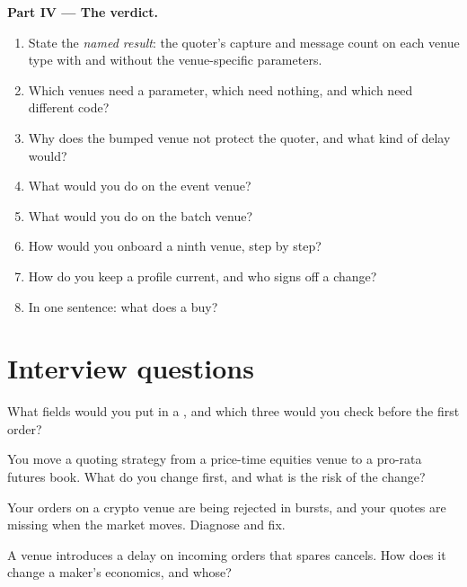 \begin{problem}
\medskip\noindent\textbf{Part IV --- The verdict.}
\begin{enumerate}[resume]
\item State the \emph{named result}: the quoter's capture and message count on each venue type with and without the venue-specific parameters.
\item Which venues need a parameter, which need nothing, and which need different code?
\item Why does the bumped venue not protect the quoter, and what kind of delay would?
\item What would you do on the event venue?
\item What would you do on the batch venue?
\item How would you onboard a ninth venue, step by step?
\item How do you keep a profile current, and who signs off a change?
\item In one sentence: what does a  buy?
\end{enumerate}
\end{problem}

\section{Interview questions}

\begin{interviewq}\label{iq:hf:a-venue-playbook:1}
What fields would you put in a , and which three would you check before the first order?
\end{interviewq}

\begin{interviewq}\label{iq:hf:a-venue-playbook:2}
You move a quoting strategy from a price-time equities venue to a pro-rata futures book. What do you change first, and what is the risk of the
change?
\end{interviewq}

\begin{interviewq}\label{iq:hf:a-venue-playbook:3}
Your orders on a crypto venue are being rejected in bursts, and your quotes are missing when the market moves. Diagnose and fix.
\end{interviewq}

\begin{interviewq}\label{iq:hf:a-venue-playbook:4}
A venue introduces a delay on incoming orders that spares cancels. How does it change a maker's economics, and whose?
\end{interviewq}

